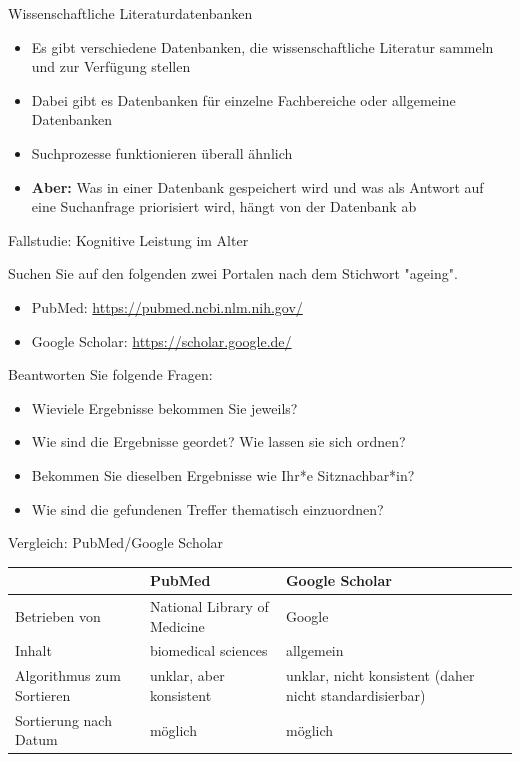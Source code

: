 \documentclass{beamer}
\begin{document}
\begin{frame}{Wissenschaftliche Literaturdatenbanken}

\begin{itemize}
    \item 
    Es gibt verschiedene Datenbanken, die wissenschaftliche Literatur sammeln und zur Verfügung stellen
    \item 
    Dabei gibt es Datenbanken für einzelne Fachbereiche oder allgemeine Datenbanken
    \item 
    Suchprozesse funktionieren überall ähnlich
    \item 
    \textbf{Aber:} Was in einer Datenbank gespeichert wird und was als Antwort auf eine Suchanfrage priorisiert wird, hängt von der Datenbank ab
\end{itemize}
    
\end{frame}


\begin{frame}{Fallstudie: Kognitive Leistung im Alter}

Suchen Sie auf den folgenden zwei Portalen nach dem Stichwort "ageing".

\begin{itemize}
    \item 
PubMed: \url{https://pubmed.ncbi.nlm.nih.gov/}
\item 
Google Scholar: \url{https://scholar.google.de/}
\end{itemize}


Beantworten Sie folgende Fragen:

\begin{itemize}
    \item 
    Wieviele Ergebnisse bekommen Sie jeweils?
    \item 
    Wie sind die Ergebnisse geordet? Wie lassen sie sich ordnen?
    \item 
    Bekommen Sie dieselben Ergebnisse wie Ihr*e Sitznachbar*in?
    \item 
    Wie sind die gefundenen Treffer thematisch einzuordnen?
\end{itemize}

\end{frame}

\begin{frame}{Vergleich: PubMed/Google Scholar}

\begin{tabular}{|p{3cm}|p{4cm}|p{4cm}|}
\hline
                & \textbf{PubMed}                       & \textbf{Google Scholar} \\
\hline
Betrieben von   & National Library of Medicine  & Google \\
\hline
Inhalt          & biomedical sciences    & allgemein \\
\hline
Algorithmus zum Sortieren   & unklar, aber konsistent   & unklar, nicht konsistent (daher nicht standardisierbar) \\
\hline
Sortierung nach Datum       & möglich                   & möglich \\
\hline
\end{tabular}


\end{frame}
\end{document}
